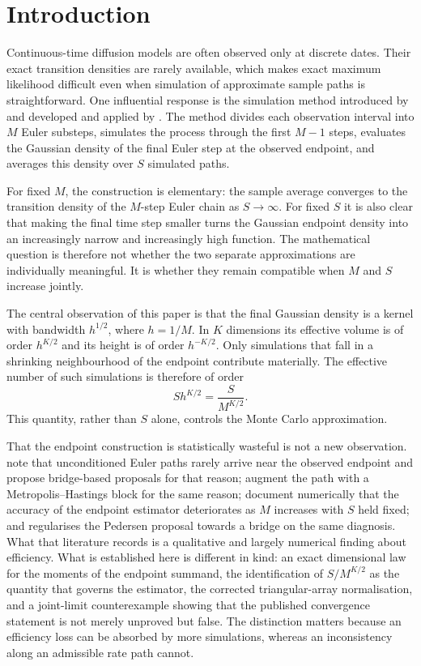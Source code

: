 \documentclass[11pt]{article}
\theoremstyle{definition}
\begin{document}
\section{Introduction}

Continuous-time diffusion models are often observed only at discrete dates. Their exact transition densities are rarely available, which makes exact maximum likelihood difficult even when simulation of approximate sample paths is straightforward. One influential response is the simulation method introduced by \citet{Pedersen1995a,Pedersen1995b} and developed and applied by \citet{BrandtSantaClara2002}. The method divides each observation interval into $M$ Euler substeps, simulates the process through the first $M-1$ steps, evaluates the Gaussian density of the final Euler step at the observed endpoint, and averages this density over $S$ simulated paths.

For fixed $M$, the construction is elementary: the sample average converges to the transition density of the $M$-step Euler chain as $S\to\infty$. For fixed $S$ it is also clear that making the final time step smaller turns the Gaussian endpoint density into an increasingly narrow and increasingly high function. The mathematical question is therefore not whether the two separate approximations are individually meaningful. It is whether they remain compatible when $M$ and $S$ increase jointly.

The central observation of this paper is that the final Gaussian density is a kernel with bandwidth $h^{1/2}$, where $h=1/M$. In $K$ dimensions its effective volume is of order $h^{K/2}$ and its height is of order $h^{-K/2}$. Only simulations that fall in a shrinking neighbourhood of the endpoint contribute materially. The effective number of such simulations is therefore of order
\[
S h^{K/2}=\frac{S}{M^{K/2}}.
\]
This quantity, rather than $S$ alone, controls the Monte Carlo approximation.

That the endpoint construction is statistically wasteful is not a new observation. \citet{DurhamGallant2002} note that unconditioned Euler paths rarely arrive near the observed endpoint and propose bridge-based proposals for that reason; \citet{ElerianChibShephard2001} augment the path with a Metropolis--Hastings block for the same reason; \citet{StramerYan2007} document numerically that the accuracy of the endpoint estimator deteriorates as $M$ increases with $S$ held fixed; and \citet{Lindstrom2012} regularises the Pedersen proposal towards a bridge on the same diagnosis. What that literature records is a qualitative and largely numerical finding about efficiency. What is established here is different in kind: an exact dimensional law for the moments of the endpoint summand, the identification of $S/M^{K/2}$ as the quantity that governs the estimator, the corrected triangular-array normalisation, and a joint-limit counterexample showing that the published convergence statement is not merely unproved but false. The distinction matters because an efficiency loss can be absorbed by more simulations, whereas an inconsistency along an admissible rate path cannot.
\end{document}
